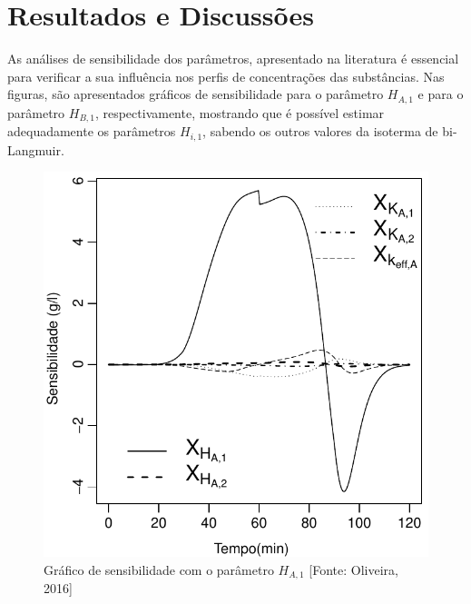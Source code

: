 \documentclass[por]{Template_SBEF}
\begin{document}
\section{Resultados e Discussões}
As análises de sensibilidade dos parâmetros, apresentado na literatura \cite{claudir_tese} é essencial para verificar a sua influência nos perfis de concentrações das substâncias. Nas figuras, são apresentados gráficos de sensibilidade para o parâmetro $H_{A,1}$ e para o parâmetro $H_{B,1}$, respectivamente, mostrando que é possível estimar adequadamente os parâmetros $H_{i,1}$, sabendo os outros valores da isoterma de bi-Langmuir.




\begin{figure}[H] 
	\centering
	\includegraphics[width=.8\columnwidth]{Arquivos/SensibilidadeCa-all.pdf} 
	\caption{Gráfico de sensibilidade com o parâmetro $H_{A,1}$ [Fonte: Oliveira, 2016]} 
\end{figure}
\end{document}
